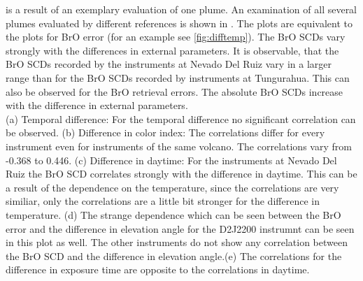 \documentclass  [
  paper    = a4,
  BCOR     = 10mm,
  twoside,
  fontsize = 12pt,
  fleqn,
  toc      = bibnumbered,
  toc      = listofnumbered,
  numbers  = noendperiod,
  headings = normal,
  listof   = leveldown,
  version  = 3.03
]                                       {scrreprt}
\begin{document}
	 is a result of an exemplary evaluation of one plume. An examination of all several plumes evaluated by different references is shown in . The plots are equivalent to the plots for BrO error (for an example see \cref{fig:difftemp}). The BrO SCDs vary strongly with the differences in external parameters. It is observable, that the BrO SCDs recorded by the instruments at Nevado Del Ruiz vary in a larger range than for the BrO SCDs recorded by instruments at Tungurahua. This can also be observed for the BrO retrieval errors. The absolute BrO SCDs increase with the difference in external parameters.\\
	 (a) Temporal difference: For the temporal difference no significant correlation can be observed. (b) Difference in color index: The correlations differ for every instrument even for instruments of the same volcano. The correlations vary from -0.368 to 0.446. (c) Difference in daytime: For the instruments at Nevado Del Ruiz the BrO SCD correlates strongly with the difference in daytime. This can be a result of the dependence on the temperature, since the correlations are very similiar, only the correlations are a little bit stronger for the difference in temperature. (d) The strange dependence which can be seen between the BrO error and the difference in elevation angle for the D2J2200 instrumnt can be seen in this plot as well. The other instruments do not show any correlation between the BrO SCD and the difference in elevation angle.(e) The correlations for the difference in exposure time are opposite to the correlations in daytime. 
\end{document}
